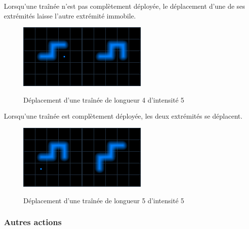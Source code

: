 Lorsqu'une traînée n'est pas complètement déployée, le déplacement d'une de ses extrémités laisse l'autre extrémité immobile.

\begin{figure}[h]
\centering
\includegraphics{deplacement1.png}\hspace{5mm}\includegraphics{deplacement2.png}
\caption{Déplacement d'une traînée de longueur 4 d'intensité 5}
\end{figure}

\newpage

Lorsqu'une traînée est complètement déployée, les deux extrémités se déplacent.

\begin{figure}[h]
\centering
\includegraphics{deplacement3.png}\hspace{5mm}\includegraphics{deplacement4.png}
\caption{Déplacement d'une traînée de longueur 5 d'intensité 5}
\end{figure}

\subsubsection{Autres actions}


